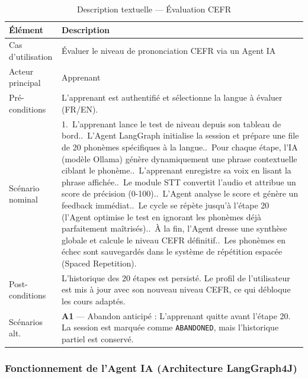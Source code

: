 \begin{table}[H]
\centering
\small
\renewcommand{\arraystretch}{1.3}
\begin{tabular}{|l|p{10cm}|}
\hline
\rowcolor[gray]{0.88}
\textbf{Élément} & \textbf{Description} \\
\hline
Cas d'utilisation & Évaluer le niveau de prononciation CEFR via un Agent IA \\
\hline
Acteur principal  & Apprenant \\
\hline
Pré-conditions    & L'apprenant est authentifié et sélectionne la langue à évaluer (FR/EN). \\
\hline
Scénario nominal  &
    1.~L'apprenant lance le test de niveau depuis son tableau de bord.\newline
    2.~L'Agent LangGraph initialise la session et prépare une file de 20 phonèmes spécifiques à la langue.\newline
    3.~Pour chaque étape, l'IA (modèle Ollama) génère dynamiquement une phrase contextuelle ciblant le phonème.\newline
    4.~L'apprenant enregistre sa voix en lisant la phrase affichée.\newline
    5.~Le module STT convertit l'audio et attribue un score de précision (0-100).\newline
    6.~L'Agent analyse le score et génère un feedback immédiat.\newline
    7.~Le cycle se répète jusqu'à l'étape 20 (l'Agent optimise le test en ignorant les phonèmes déjà parfaitement maîtrisés).\newline
    8.~À la fin, l'Agent dresse une synthèse globale et calcule le niveau CEFR définitif.\newline
    9.~Les phonèmes en échec sont sauvegardés dans le système de répétition espacée (Spaced Repetition). \\
\hline
Post-conditions   & L'historique des 20 étapes est persisté. Le profil de l'utilisateur est mis à jour avec son nouveau niveau CEFR, ce qui débloque les cours adaptés. \\
\hline
Scénarios alt.    &
    \textbf{A1} --- Abandon anticipé : L'apprenant quitte avant l'étape 20. La session est marquée comme \texttt{ABANDONED}, mais l'historique partiel est conservé. \\
\hline
\end{tabular}
\caption{Description textuelle --- Évaluation CEFR}
\label{tab:desc-cefr}
\end{table}

\subsubsection{Fonctionnement de l'Agent IA (Architecture LangGraph4J)}

